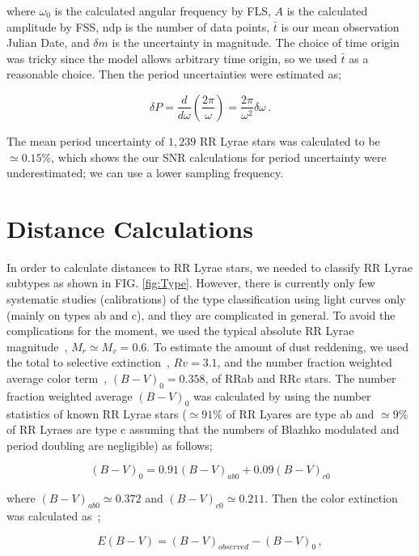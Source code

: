 \documentclass[aps,prb,twocolumn,superscriptaddress]{revtex4-1}
\begin{document}
\noindent where $\omega_0$ is the calculated angular frequency by FLS, $A$ is the calculated amplitude by FSS, ndp is the number of data points, $\bar{t}$ is our mean observation Julian Date, and $\delta m$ is the uncertainty in magnitude. The choice of time origin was tricky since the model allows arbitrary time origin, so we used $\bar{t}$ as a reasonable choice. Then the period uncertainties were estimated as;


\begin{equation}
\label{PEE}
\delta P = \frac{d}{d\omega} \left(\frac{2\pi}{\omega} \right) = \frac{2\pi}{\omega^2} \delta \omega \, .
\end{equation}

\indent The mean period uncertainty of $1,239$ RR Lyrae stars was calculated to be $\simeq 0.15 \%$, which shows the our SNR calculations for period uncertainty were underestimated; we can use a lower sampling frequency.


\section{Distance Calculations}

In order to calculate distances to RR Lyrae stars, we needed to classify RR Lyrae subtypes as shown in FIG. \ref{fig:Type}. However, there is currently only few systematic studies (calibrations) of the type classification using light curves only (mainly on types ab and c), and they are complicated in general. To avoid the complications for the moment, we used the typical absolute RR Lyrae magnitude~\citep{PSdata}, $M_r \simeq M_v = 0.6$. To estimate the amount of dust reddening, we used the total to selective extinction~\citep{Rv}, $Rv=3.1$, and the number fraction weighted average color term~\citep{EBV}, $(B-V)_0 = 0.358$, of RRab and RRc stars. The number fraction weighted average $(B-V)_0$ was calculated by using the number statistics of known RR Lyrae stars ($\simeq91\%$ of RR Lyares are type ab and $\simeq9\%$ of RR Lyraes are type c assuming that the numbers of Blazhko modulated and period doubling are negligible) as follows;

\begin{equation}
\label{BV}
(B-V)_0 = 0.91(B-V)_{ab0} + 0.09(B-V)_{c0}
\end{equation}

\noindent where $(B-V)_{ab0} \simeq 0.372$ and $(B-V)_{c0} \simeq 0.211$. Then the color extinction was calculated as~\cite{Modern};

\begin{equation}
\label{EBV}
E(B-V) = (B-V)_{observed} - (B-V)_0 \, ,
\end{equation}
\end{document}
